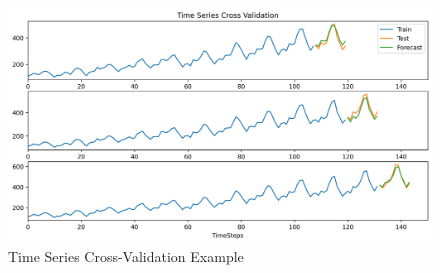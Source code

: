 \begin{figure}[H]
    \center
    \includegraphics[scale=0.45]{notebooks/Others/img/time_series_cross_validation.png}
    \caption{Time Series Cross-Validation Example}
\end{figure}








